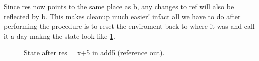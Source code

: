         Since res now points to the same place as b, any changes to ref will also be reflected by b. This makes cleanup much easier!
        infact all we have to do after performing the procedure is to reset the enviroment back to where it was and call it a day makng the state look like
        \cref{fig:mainEndCallRef}.
    \begin{figure}[!h]
        \caption{State after res = x+5 in add5 (reference out).}
        \label{fig:mainEndCallRef}
    \end{figure}